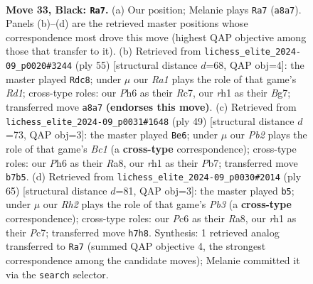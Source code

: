 \documentclass[11pt]{article}
\begin{document}
\clearpage

\begin{figure}[p]\centering
\begin{subfigure}{0.46\textwidth}\centering
\resizebox{\linewidth}{!}{%
\newchessgame
\chessboard[
  setfen={rk3b2/1p4pr/p1p1b2p/P4p2/2pP3P/2B1P3/1PK2PPN/R6R b - - 1 33},
  showmover=false,
  pgfstyle=straightmove, color=movearrow, markmove={a8-a7}
]}
\caption{}
\end{subfigure}\hfill
\begin{subfigure}{0.46\textwidth}\centering
\resizebox{\linewidth}{!}{%
\newchessgame
\chessboard[
  setfen={3r2k1/1pr2pbp/p3p1p1/P7/1P1pP3/3P1P1P/R3K1P1/1N1R4 b - - 3 28},
  showmover=false,
  pgfstyle=straightmove, color=movearrow, markmove={d8-c8}
]}
\caption{}
\end{subfigure}
\\[4pt]
\begin{subfigure}{0.46\textwidth}\centering
\resizebox{\linewidth}{!}{%
\newchessgame
\chessboard[
  setfen={r1b5/1p3p2/2pb2kp/5p2/p1PPp3/2B1P1P1/PP2B2P/R5K1 b - - 0 25},
  showmover=false,
  pgfstyle=straightmove, color=movearrow, markmove={c8-e6}
]}
\caption{}
\end{subfigure}\hfill
\begin{subfigure}{0.46\textwidth}\centering
\resizebox{\linewidth}{!}{%
\newchessgame
\chessboard[
  setfen={r5k1/2p2p1n/1pPp2p1/3P3p/1P1b1P2/p5PP/P5BK/2R2R2 b - - 1 33},
  showmover=false,
  pgfstyle=straightmove, color=movearrow, markmove={b6-b5}
]}
\caption{}
\end{subfigure}
\caption{\textbf{Move 33, Black: \texttt{Ra7}.} (a) Our position; Melanie plays \texttt{Ra7} (\texttt{a8a7}). Panels (b)--(d) are the retrieved master positions whose correspondence most drove this move (highest QAP objective among those that transfer to it). (b) Retrieved from \texttt{lichess\_elite\_2024-09\_p0020\#3244} (ply 55) [structural distance $d$=68, QAP obj=4]: the master played \texttt{Rdc8}; under $\mu$ our \emph{Ra1} plays the role of that game's \emph{Rd1}; cross-type roles: our \emph{P}h6 as their \emph{R}c7, our \emph{r}h1 as their \emph{B}g7; transferred move \texttt{a8a7} \textbf{(endorses this move)}. (c) Retrieved from \texttt{lichess\_elite\_2024-09\_p0031\#1648} (ply 49) [structural distance $d$=73, QAP obj=3]: the master played \texttt{Be6}; under $\mu$ our \emph{Pb2} plays the role of that game's \emph{Bc1} (a \textbf{cross-type} correspondence); cross-type roles: our \emph{P}h6 as their \emph{R}a8, our \emph{r}h1 as their \emph{P}b7; transferred move \texttt{b7b5}. (d) Retrieved from \texttt{lichess\_elite\_2024-09\_p0030\#2014} (ply 65) [structural distance $d$=81, QAP obj=3]: the master played \texttt{b5}; under $\mu$ our \emph{Rh2} plays the role of that game's \emph{Pb3} (a \textbf{cross-type} correspondence); cross-type roles: our \emph{P}c6 as their \emph{R}a8, our \emph{r}h1 as their \emph{P}c7; transferred move \texttt{h7h8}. Synthesis: 1 retrieved analog transferred to \texttt{Ra7} (summed QAP objective 4, the strongest correspondence among the candidate moves); Melanie committed it via the \texttt{search} selector.}
\label{fig:thought-m65}
\end{figure}
\end{document}
